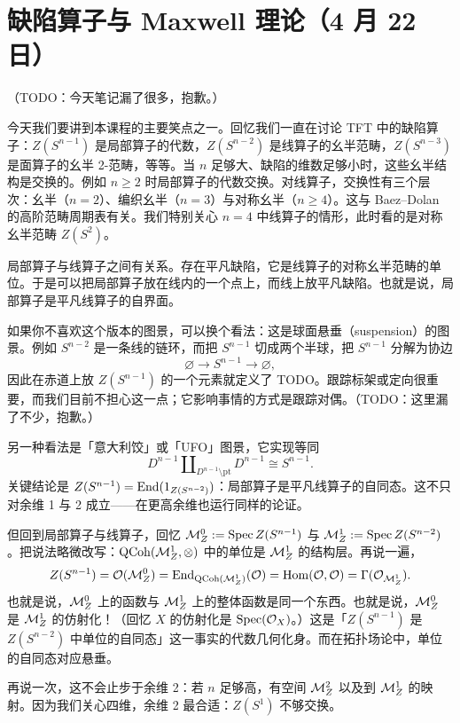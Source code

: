 \section[缺陷算子与 Maxwell 理论]{缺陷算子与 Maxwell 理论（4 月 22 日）}


（TODO：今天笔记漏了很多，抱歉。）

今天我们要讲到本课程的主要笑点之一。回忆我们一直在讨论 TFT 中的缺陷算子：$Z(S^{n-1})$ 是局部算子的代数，$Z(S^{n-2})$ 是线算子的幺半范畴，$Z(S^{n-3})$ 是面算子的幺半 2-范畴，等等。当 $n$ 足够大、缺陷的维数足够小时，这些幺半结构是交换的。例如 $n\ge2$ 时局部算子的代数交换。对线算子，交换性有三个层次：幺半（$n=2$）、编织幺半（$n=3$）与对称幺半（$n\ge4$）。这与 Baez--Dolan 的高阶范畴周期表有关。我们特别关心 $n=4$ 中线算子的情形，此时看的是对称幺半范畴 $Z(S^2)$。

局部算子与线算子之间有关系。存在平凡缺陷，它是线算子的对称幺半范畴的单位。于是可以把局部算子放在线内的一个点上，而线上放平凡缺陷。也就是说，局部算子是平凡线算子的自界面。

如果你不喜欢这个版本的图景，可以换个看法：这是球面悬垂（suspension）的图景。例如 $S^{n-2}$ 是一条线的链环，而把 $S^{n-1}$ 切成两个半球，把 $S^{n-1}$ 分解为协边
\[
\varnothing\longrightarrow S^{n-1}\longrightarrow\varnothing,
\]
因此在赤道上放 $Z(S^{n-1})$ 的一个元素就定义了 TODO。跟踪标架或定向很重要，而我们目前不担心这一点；它影响事情的方式是跟踪对偶。（TODO：这里漏了不少，抱歉。）

另一种看法是「意大利饺」或「UFO」图景，它实现等同
\[
D^{n-1}\amalg_{D^{n-1}\setminus\mathrm{pt}}D^{n-1}\cong S^{n-1}.
\]
关键结论是 $Z(S^{n-1})=\operatorname{End}(1_{Z(S^{n-2})})$：局部算子是平凡线算子的自同态。这不只对余维 1 与 2 成立——在更高余维也运行同样的论证。

但回到局部算子与线算子，回忆 $\mathcal{M}^0_Z:=\operatorname{Spec} Z(S^{n-1})$ 与 $\mathcal{M}^1_Z:=\operatorname{Spec} Z(S^{n-2})$。把说法略微改写：$\mathrm{QCoh}(\mathcal{M}^1_Z,\otimes)$ 中的单位是 $\mathcal{M}^1_Z$ 的结构层。再说一遍，
\[
Z(S^{n-1})=\mathcal{O}(\mathcal{M}^0_Z)=\operatorname{End}_{\mathrm{QCoh}(\mathcal{M}^1_Z)}(\mathcal{O})=\operatorname{Hom}(\mathcal{O},\mathcal{O})=\Gamma(\mathcal{O}_{\mathcal{M}^1_Z}).
\]
也就是说，$\mathcal{M}^0_Z$ 上的函数与 $\mathcal{M}^1_Z$ 上的整体函数是同一个东西。也就是说，$\mathcal{M}^0_Z$ 是 $\mathcal{M}^1_Z$ 的仿射化！（回忆 $X$ 的仿射化是 $\operatorname{Spec}(\mathcal{O}_X)$。）这是「$Z(S^{n-1})$ 是 $Z(S^{n-2})$ 中单位的自同态」这一事实的代数几何化身。而在拓扑场论中，单位的自同态对应悬垂。

再说一次，这不会止步于余维 2：若 $n$ 足够高，有空间 $\mathcal{M}^2_Z$ 以及到 $\mathcal{M}^1_Z$ 的映射。因为我们关心四维，余维 2 最合适：$Z(S^1)$ 不够交换。


